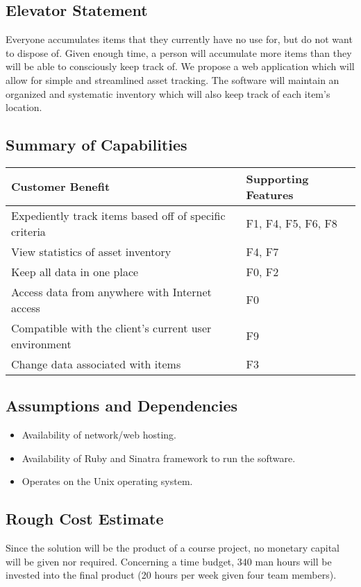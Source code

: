 \documentclass{article}
\begin{document}
\subsection{Elevator Statement}
Everyone accumulates items that they currently have no use for, but do not want to dispose of.  Given enough time, a person will accumulate more items than they will be able to consciously keep track of. We propose a web application which will allow for simple and streamlined asset tracking. The software will maintain an organized and systematic inventory which will also keep track of each item's location.

\subsection{Summary of Capabilities}
\begin{tabular}{ | p{4.0in} | p{2.0in} | }
\hline
\textbf{Customer Benefit} & \textbf{Supporting Features}\\
\hline
\hline
Expediently track items based off of specific criteria & F1, F4, F5, F6, F8\\
\hline
View statistics of asset inventory & F4, F7\\
\hline
Keep all data in one place & F0, F2\\
\hline
Access data from anywhere with Internet access & F0\\
\hline
Compatible with the client's current user environment & F9\\
\hline
Change data associated with items & F3\\
\hline
\end{tabular}

\subsection{Assumptions and Dependencies}
\begin{itemize}
\item Availability of network/web hosting.
\item Availability of Ruby and Sinatra framework to run the software.
\item Operates on the Unix operating system.
\end{itemize}

\subsection{Rough Cost Estimate}
Since the solution will be the product of a course project, no monetary capital will be given nor required.  Concerning a time budget, 340 man hours will be invested into the final product (20 hours per week given four team members).
\end{document}
